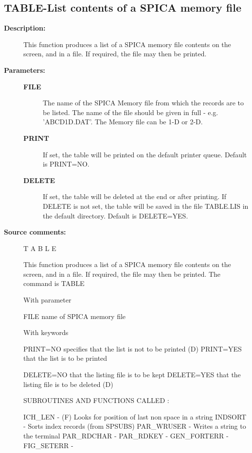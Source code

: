 \subsection{TABLE-\label{TABLE}List contents of a SPICA memory file}
\begin{description}

\item [\textbf{Description:}]
 This function produces a list of a SPICA memory file contents
 on the screen, and in a file. If required, the file may then
 be printed.

\item [\textbf{Parameters:}]
\begin{description}
\item [\textbf{FILE}]
 The name of the SPICA Memory file from which the
 records are to be listed.  The name of the file should be
 given in full - e.g. 'ABCD1D.DAT'.  The Memory file can be
 1-D or 2-D.
\item [\textbf{PRINT}]
 If set, the table will be printed on the default printer
 queue.  Default is PRINT=NO.
\item [\textbf{DELETE}]
 If set, the table will be deleted at the end or after
 printing.  If DELETE is not set, the table will be
 saved in the file TABLE.LIS in the default directory.
 Default is DELETE=YES.
\end{description}

\item [\textbf{Source comments:}]
\begin{terminalv}
 T A B L E

  This function produces a list of a SPICA memory file contents
  on the screen, and in a file. If required, the file may then
  be printed. The command is TABLE

  With parameter

  FILE     name of SPICA memory file

  With keywords

  PRINT=NO   specifies that the list is not to be printed (D)
  PRINT=YES  that the list is to be printed

  DELETE=NO  that the listing file is to be kept
  DELETE=YES that the listing file is to be deleted (D)


  SUBROUTINES AND FUNCTIONS CALLED :

  ICH_LEN - (F) Looks for position of last non space in a string
  INDSORT - Sorts index records                     (from SPSUBS)
  PAR_WRUSER  - Writes a string to the terminal
  PAR_RDCHAR  -
  PAR_RDKEY   -
  GEN_FORTERR -
  FIG_SETERR  -



\end{terminalv}
\end{description}
